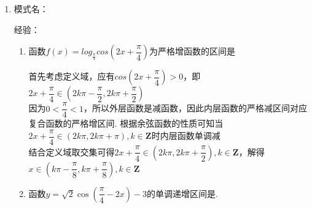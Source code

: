 \begin{enumerate}
    \begin{enumerate}
        \item 已知$sinx + siny = \sqrt{2}, cosx + cosy = \dfrac{2\sqrt{3}}{3}$，求$cos(x+y)$及$tanx + tany$的值.
        \begin{jieda}
            $sinx + siny = \sqrt{2}$即$2sin(\dfrac{x+y}{2})cos(\dfrac{x-y}{2}) = \sqrt{2}$，\\
            $cosx + cosy = \dfrac{2\sqrt{3}}{3}$即$2cos(\dfrac{x+y}{2})cos(\dfrac{x-y}{2}) = \dfrac{2\sqrt{3}}{3}$，故$tan(\dfrac{x+y}{2}) = \dfrac{\sqrt{6}}{2}$，因此$cos(x+y) = \dfrac{1-tan^2(\dfrac{x+y}{2})}{1+tan^2(\dfrac{x+y}{2})} = -\dfrac{1}{5}$ \\
            $tanx + tany = \dfrac{sinx \cdot cosy + cosx \cdot siny}{cosx \cdot cosy} = \dfrac{sin(x+y)}{cosx \cdot cosy}$ \\
            $cosx \cdot cosy = \dfrac{1}{2}[cos(x+y) + cos(x-y)]$ \\
            对$sinx + siny = \sqrt{2}, cosx + cosy = \dfrac{2\sqrt{3}}{3}$两式平方相加得$cos(x-y) = \dfrac{2}{3}$，故$cosx \cdot cosy = \dfrac{7}{30}$ \\
            $sin(x+y) = \dfrac{2tan(\dfrac{x+y}{2})}{1 + tan^2(\dfrac{x+y}{2})} = \dfrac{\sqrt{6}}{\dfrac{5}{2}} = \dfrac{2\sqrt{6}}{5}$ \\
            故$tanx + tany = \dfrac{sin(x+y)}{cosx \cdot cosy} = \dfrac{\dfrac{2\sqrt{6}}{5}}{\dfrac{7}{30}} = \dfrac{12\sqrt{6}}{7}$
        \end{jieda}
    \end{enumerate}
    \item
    模式名：

    经验：
    \begin{enumerate}
        \item 函数$f(x) = log_{\frac{\pi}{4}}cos(2x+\dfrac{\pi}{4})$为严格增函数的区间是
        \begin{jieda}
            首先考虑定义域，应有$cos(2x+\dfrac{\pi}{4}) > 0$，即$2x + \dfrac{\pi}{4} \in (2k\pi - \dfrac{\pi}{2}, 2k\pi + \dfrac{\pi}{2})$ \\
            因为$0 < \dfrac{\pi}{4} < 1$，所以外层函数是减函数，因此内层函数的严格减区间对应复合函数的严格增区间. 根据余弦函数的性质可知当$2x+\dfrac{\pi}{4} \in (2k\pi, 2k\pi+\pi), k \in \mathbf{Z}$时内层函数单调减 \\
            结合定义域取交集可得$2x+\dfrac{\pi}{4} \in (2k\pi, 2k\pi + \dfrac{\pi}{2}), k \in \mathbf{Z}$，解得$x \in  (k\pi - \dfrac{\pi}{8}, k\pi + \dfrac{\pi}{8}), k\in \mathbf{Z}$
        \end{jieda}
        \item 函数$y=\sqrt{2}\cos\left(\dfrac{\pi}{4}-2x\right)-3$的单调递增区间是. 
    \end{enumerate}
    

\end{enumerate}
